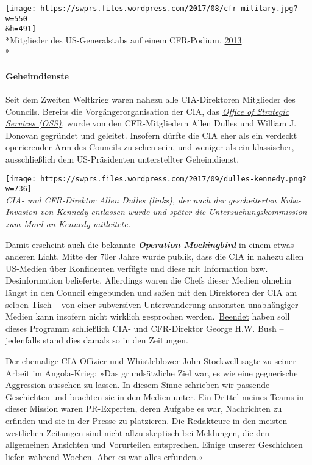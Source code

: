 \texttt{[image: https://swprs.files.wordpress.com/2017/08/cfr-military.jpg?w=550\\\&h=491]}\\
*Mitglieder des US-Generalstabs auf einem CFR-Podium,
\href{https://commons.wikimedia.org/wiki/File:From_left,_the_35th_Commandant_of_the_Marine_Corps,_Gen._James_F._Amos;_Army_Chief_of_Staff_Gen._Raymond_T._Odierno;_Air_Force_Chief_of_Staff_Gen._Mark_A._Welsh_III;_Commandant_of_the_Coast_Guard,_Adm._Robert_J_130508-M-LU710-167.jpg}{2013}.\\
*

\hypertarget{geheimdienste}{%
\paragraph{Geheimdienste}\label{geheimdienste}}

Seit dem Zweiten Weltkrieg waren nahezu alle CIA-Direktoren Mitglieder
des Councils. Bereits die Vorgänger­organisation der CIA, das
\emph{\href{https://en.wikipedia.org/wiki/Office_of_Strategic_Services}{Office
of Strategic Services (OSS)},} wurde von den CFR-Mitgliedern Allen
Dulles und William J. Donovan gegründet und geleitet. Insofern dürfte
die CIA eher als ein verdeckt operierender Arm des Councils zu sehen
sein, und weniger als ein klassischer, ausschließlich dem US-Präsidenten
unterstellter Geheimdienst.

\texttt{[image: https://swprs.files.wordpress.com/2017/09/dulles-kennedy.png?w=736]}\\
\emph{CIA- und CFR-Direktor Allen Dulles (links), der nach der
gescheiterten Kuba-Invasion von Kennedy entlassen wurde und später die
Untersuchungs­kommission zum Mord an Kennedy mitleitete.}

Damit erscheint auch die bekannte \emph{\textbf{Operation Mockingbird}}
in einem etwas anderen Licht. Mitte der 70er Jahre wurde publik, dass
die CIA in nahezu allen US-Medien
\href{https://en.wikipedia.org/wiki/Operation_Mockingbird}{über
Konfidenten verfügte} und diese mit Information bzw. Desinformation
belieferte. Allerdings waren die Chefs dieser Medien ohnehin längst in
den Council eingebunden und saßen mit den Direktoren der CIA am selben
Tisch -- von einer subversiven Unter­wanderung ansonsten unabhängiger
Medien kann insofern nicht wirklich gesprochen
werden.~\href{https://en.wikipedia.org/wiki/Operation_Mockingbird}{Beendet}
haben soll dieses Programm schließlich CIA- und CFR-Direktor George H.W.
Bush -- jedenfalls stand dies damals so in den Zeitungen.

Der ehemalige CIA-Offizier und Whistleblower John Stockwell
\href{https://swprs.org/video-the-cia-and-the-media/}{sagte} zu seiner
Arbeit im Angola-Krieg: »Das grundsätzliche Ziel war, es wie eine
gegnerische Aggression aussehen zu lassen. In diesem Sinne schrieben wir
passende Geschichten und brachten sie in den Medien unter. Ein Drittel
meines Teams in dieser Mission waren PR-Experten, deren Aufgabe es war,
Nachrichten zu erfinden und sie in der Presse zu platzieren. Die
Redakteure in den meisten westlichen Zeitungen sind nicht allzu
skeptisch bei Meldungen, die den allgemeinen Ansichten und Vorurteilen
entsprechen. Einige unserer Geschichten liefen während Wochen. Aber es
war alles erfunden.«

